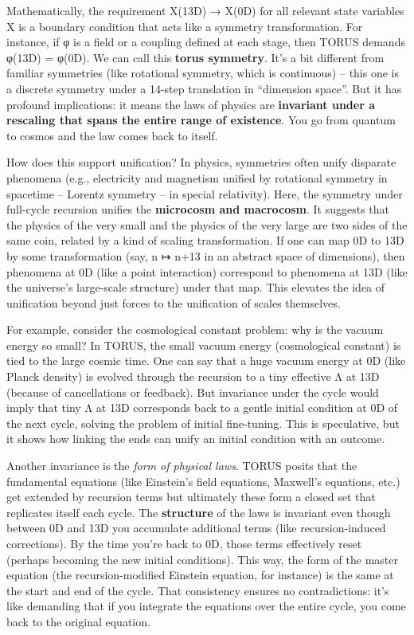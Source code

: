 \documentclass[
]{article}
\begin{document}
Mathematically, the requirement X(13D) → X(0D) for all relevant state
variables X is a boundary condition that acts like a symmetry
transformation\hspace{0pt}. For instance, if φ is a field or a coupling
defined at each stage, then TORUS demands φ(13D) = φ(0D). We can call
this \textbf{torus symmetry}. It's a bit different from familiar
symmetries (like rotational symmetry, which is continuous) -- this one
is a discrete symmetry under a 14-step translation in ``dimension
space''. But it has profound implications: it means the laws of physics
are \textbf{invariant under a rescaling that spans the entire range of
existence}. You go from quantum to cosmos and the law comes back to
itself.

How does this support unification? In physics, symmetries often unify
disparate phenomena (e.g., electricity and magnetism unified by
rotational symmetry in spacetime -- Lorentz symmetry -- in special
relativity). Here, the symmetry under full-cycle recursion unifies the
\textbf{microcosm and macrocosm}. It suggests that the physics of the
very small and the physics of the very large are two sides of the same
coin, related by a kind of scaling transformation. If one can map 0D to
13D by some transformation (say, n ↦ n+13 in an abstract space of
dimensions), then phenomena at 0D (like a point interaction) correspond
to phenomena at 13D (like the universe's large-scale structure) under
that map. This elevates the idea of unification beyond just forces to
the unification of scales themselves.

For example, consider the cosmological constant problem: why is the
vacuum energy so small? In TORUS, the small vacuum energy (cosmological
constant) is tied to the large cosmic time. One can say that a huge
vacuum energy at 0D (like Planck density) is evolved through the
recursion to a tiny effective Λ at 13D (because of cancellations or
feedback). But invariance under the cycle would imply that tiny Λ at 13D
corresponds back to a gentle initial condition at 0D of the next cycle,
solving the problem of initial fine-tuning. This is speculative, but it
shows how linking the ends can unify an initial condition with an
outcome.

Another invariance is the \emph{form of physical laws}. TORUS posits
that the fundamental equations (like Einstein's field equations,
Maxwell's equations, etc.) get extended by recursion terms but
ultimately these form a closed set that replicates itself each cycle.
The \textbf{structure} of the laws is invariant even though between 0D
and 13D you accumulate additional terms (like recursion-induced
corrections). By the time you're back to 0D, those terms effectively
reset (perhaps becoming the new initial conditions). This way, the form
of the master equation (the recursion-modified Einstein equation, for
instance) is the same at the start and end of the cycle\hspace{0pt}.
That consistency ensures no contradictions: it's like demanding that if
you integrate the equations over the entire cycle, you come back to the
original equation.
\end{document}
